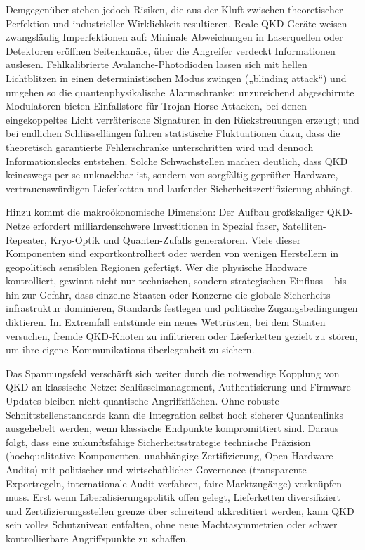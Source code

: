 Demgegenüber stehen jedoch Risiken, die aus der Kluft zwischen theoretischer Perfektion und industrieller Wirklichkeit resultieren. Reale QKD-Geräte weisen zwangsläufig Imperfektionen auf: Mininale Abweichungen in Laserquellen oder Detektoren eröffnen Seitenkanäle, über die Angreifer verdeckt Informationen auslesen. Fehlkalibrierte Avalanche-Photodioden lassen sich mit hellen Lichtblitzen in einen deterministischen Modus zwingen („blinding attack“) und umgehen so die quantenphysikalische Alarmschranke; unzureichend abgeschirmte Modulatoren bieten Einfallstore für Trojan-Horse-Attacken, bei denen eingekoppeltes Licht verräterische Signaturen in den Rückstreuungen erzeugt; und bei endlichen Schlüssellängen führen statistische Fluktuationen dazu, dass die theoretisch garantierte Fehlerschranke unterschritten wird und dennoch Informationslecks entstehen. Solche Schwachstellen machen deutlich, dass QKD keineswegs per se unknackbar ist, sondern von sorgfältig geprüfter Hardware, vertrauenswürdigen Lieferketten und laufender Sicherheitszertifizierung abhängt.

Hinzu kommt die makroökonomische Dimension: Der Aufbau großskaliger QKD-Netze erfordert milliardenschwere Investitionen in Spezial faser, Satelliten-Repeater, Kryo-Optik und Quanten-Zufalls generatoren. Viele dieser Komponenten sind exportkontrolliert oder werden von wenigen Herstellern in geopolitisch sensiblen Regionen gefertigt. Wer die physische Hardware kontrolliert, gewinnt nicht nur technischen, sondern strategischen Einfluss – bis hin zur Gefahr, dass einzelne Staaten oder Konzerne die globale Sicherheits infrastruktur dominieren, Standards festlegen und politische Zugangsbedingungen diktieren. Im Extremfall entstünde ein neues Wettrüsten, bei dem Staaten versuchen, fremde QKD-Knoten zu infiltrieren oder Lieferketten gezielt zu stören, um ihre eigene Kommunikations überlegenheit zu sichern.

Das Spannungsfeld verschärft sich weiter durch die notwendige Kopplung von QKD an klassische Netze: Schlüsselmanagement, Authentisierung und Firmware-Updates bleiben nicht-quantische Angriffsflächen. Ohne robuste Schnittstellenstandards kann die Integration selbst hoch sicherer Quantenlinks ausgehebelt werden, wenn klassische Endpunkte kompromittiert sind. Daraus folgt, dass eine zukunftsfähige Sicherheitsstrategie technische Präzision (hochqualitative Komponenten, unabhängige Zertifizierung, Open-Hardware-Audits) mit politischer und wirtschaftlicher Governance (transparente Exportregeln, internationale Audit verfahren, faire Marktzugänge) verknüpfen muss. Erst wenn Liberalisierungspolitik offen gelegt, Lieferketten diversifiziert und Zertifizierungsstellen grenze über schreitend akkreditiert werden, kann QKD sein volles Schutzniveau entfalten, ohne neue Machtasymmetrien oder schwer kontrollierbare Angriffspunkte zu schaffen. 
\cite{sunReviewSecurityEvaluation2022} 



